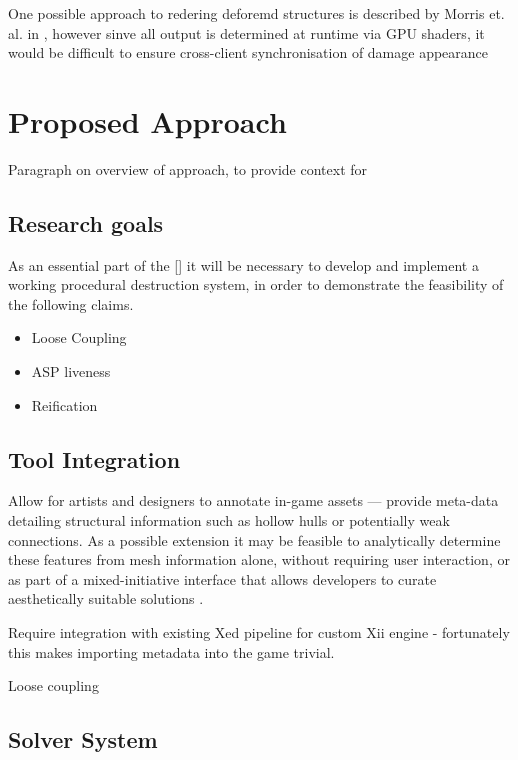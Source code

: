 \documentclass[11pt]{report}
\begin{document}
		One possible approach to redering deforemd structures is described by Morris et. al. in \cite{morris2012modular}, however sinve all output is determined at runtime via GPU shaders, it would be difficult to ensure cross-client synchronisation of damage appearance

\chapter{Proposed Approach}
	Paragraph on overview of approach, to provide context for
	\section{Research goals}
	As an essential part of the [] it will be necessary to develop and implement a working procedural destruction system, in order to demonstrate the feasibility of the following claims.
	\begin{itemize}
		\item Loose Coupling
		\item ASP liveness
		\item Reification
	\end{itemize}

	\section{Tool Integration}
		Allow for artists and designers to annotate in-game assets --- provide meta-data detailing structural information such as hollow hulls or potentially weak connections. As a possible extension it may be feasible to analytically determine these features from mesh information alone, without requiring user interaction, or as part of a mixed-initiative interface that allows developers to curate aesthetically suitable solutions \cite{yannakakis2014mixed}.

		Require integration with existing Xed pipeline for custom Xii engine - fortunately this makes importing metadata into the game trivial.

		Loose coupling \cite{lee2013decoupling}
	\section{Solver System}
\end{document}
